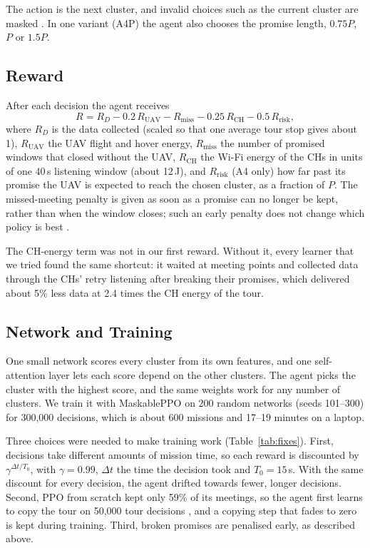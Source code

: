\documentclass[conference]{IEEEtran}
\begin{document}
The action is the next cluster, and invalid choices such as the current cluster are masked
\cite{huang2022masking}. In one variant (A4P) the agent also chooses the promise length, $0.75P$,
$P$ or $1.5P$.

\subsection{Reward}

After each decision the agent receives
\begin{equation}
R = R_D - 0.2\,R_\mathrm{UAV} - R_\mathrm{miss} - 0.25\,R_\mathrm{CH} - 0.5\,R_\mathrm{risk},
\label{eq:reward}
\end{equation}
where $R_D$ is the data collected (scaled so that one average tour stop gives about 1),
$R_\mathrm{UAV}$ the UAV flight and hover energy, $R_\mathrm{miss}$ the number of promised windows
that closed without the UAV, $R_\mathrm{CH}$ the Wi-Fi energy of the CHs in units of one 40\,s
listening window (about 12\,J), and $R_\mathrm{risk}$ (A4 only) how far past its promise the UAV is
expected to reach the chosen cluster, as a fraction of $P$. The missed-meeting penalty is given
as soon as a promise can no longer be kept, rather than when the window closes; such an early
penalty does not change which policy is best \cite{ng1999shaping}.

The CH-energy term was not in our first reward. Without it, every learner that we tried found
the same shortcut: it waited at meeting points and collected data through the CHs' retry
listening after breaking their promises, which delivered about 5\% less data at 2.4 times the CH
energy of the tour.

\subsection{Network and Training}

One small network scores every cluster from its own features, and one self-attention layer lets
each score depend on the other clusters. The agent picks the cluster with the highest score, and
the same weights work for any number of clusters. We train it with MaskablePPO
\cite{schulman2017ppo,raffin2021sb3} on 200 random networks (seeds 101--300) for 300,000
decisions, which is about 600 missions and 17--19 minutes on a laptop.

Three choices were needed to make training work (Table~\ref{tab:fixes}). First, decisions take
different amounts of mission time, so each reward is discounted by $\gamma^{\Delta t / T_0}$, with
$\gamma = 0.99$, $\Delta t$ the time the decision took and $T_0 = 15$\,s. With the same discount for
every decision, the agent drifted towards fewer, longer decisions. Second, PPO from scratch kept
only 59\% of its meetings, so the agent first learns to copy the tour on 50,000 tour decisions
\cite{rajeswaran2018dapg}, and a copying step that fades to zero is kept during training. Third,
broken promises are penalised early, as described above.
\end{document}

